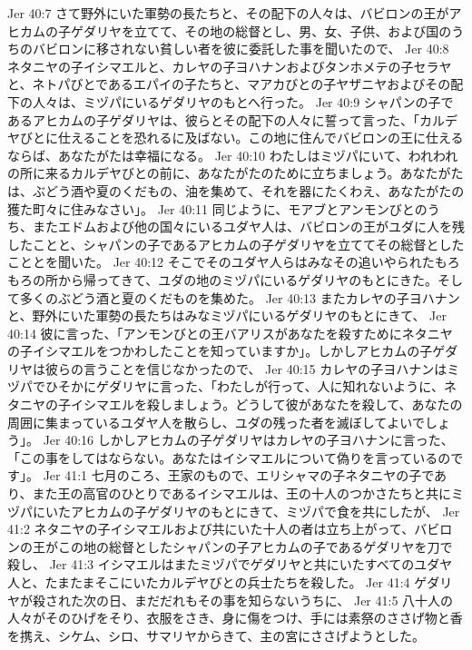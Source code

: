 Jer 40:7  さて野外にいた軍勢の長たちと、その配下の人々は、バビロンの王がアヒカムの子ゲダリヤを立てて、その地の総督とし、男、女、子供、および国のうちのバビロンに移されない貧しい者を彼に委託した事を聞いたので、
Jer 40:8  ネタニヤの子イシマエルと、カレヤの子ヨハナンおよびタンホメテの子セラヤと、ネトパびとであるエパイの子たちと、マアカびとの子ヤザニヤおよびその配下の人々は、ミヅパにいるゲダリヤのもとへ行った。
Jer 40:9  シャパンの子であるアヒカムの子ゲダリヤは、彼らとその配下の人々に誓って言った、「カルデヤびとに仕えることを恐れるに及ばない。この地に住んでバビロンの王に仕えるならば、あなたがたは幸福になる。
Jer 40:10  わたしはミヅパにいて、われわれの所に来るカルデヤびとの前に、あなたがたのために立ちましょう。あなたがたは、ぶどう酒や夏のくだもの、油を集めて、それを器にたくわえ、あなたがたの獲た町々に住みなさい」。
Jer 40:11  同じように、モアブとアンモンびとのうち、またエドムおよび他の国々にいるユダヤ人は、バビロンの王がユダに人を残したことと、シャパンの子であるアヒカムの子ゲダリヤを立ててその総督としたこととを聞いた。
Jer 40:12  そこでそのユダヤ人らはみなその追いやられたもろもろの所から帰ってきて、ユダの地のミヅパにいるゲダリヤのもとにきた。そして多くのぶどう酒と夏のくだものを集めた。
Jer 40:13  またカレヤの子ヨハナンと、野外にいた軍勢の長たちはみなミヅパにいるゲダリヤのもとにきて、
Jer 40:14  彼に言った、「アンモンびとの王バアリスがあなたを殺すためにネタニヤの子イシマエルをつかわしたことを知っていますか」。しかしアヒカムの子ゲダリヤは彼らの言うことを信じなかったので、
Jer 40:15  カレヤの子ヨハナンはミヅパでひそかにゲダリヤに言った、「わたしが行って、人に知れないように、ネタニヤの子イシマエルを殺しましょう。どうして彼があなたを殺して、あなたの周囲に集まっているユダヤ人を散らし、ユダの残った者を滅ぼしてよいでしょう」。
Jer 40:16  しかしアヒカムの子ゲダリヤはカレヤの子ヨハナンに言った、「この事をしてはならない。あなたはイシマエルについて偽りを言っているのです」。
Jer 41:1  七月のころ、王家のもので、エリシャマの子ネタニヤの子であり、また王の高官のひとりであるイシマエルは、王の十人のつかさたちと共にミヅパにいたアヒカムの子ゲダリヤのもとにきて、ミヅパで食を共にしたが、
Jer 41:2  ネタニヤの子イシマエルおよび共にいた十人の者は立ち上がって、バビロンの王がこの地の総督としたシャパンの子アヒカムの子であるゲダリヤを刀で殺し、
Jer 41:3  イシマエルはまたミヅパでゲダリヤと共にいたすべてのユダヤ人と、たまたまそこにいたカルデヤびとの兵士たちを殺した。
Jer 41:4  ゲダリヤが殺された次の日、まだだれもその事を知らないうちに、
Jer 41:5  八十人の人々がそのひげをそり、衣服をさき、身に傷をつけ、手には素祭のささげ物と香を携え、シケム、シロ、サマリヤからきて、主の宮にささげようとした。
